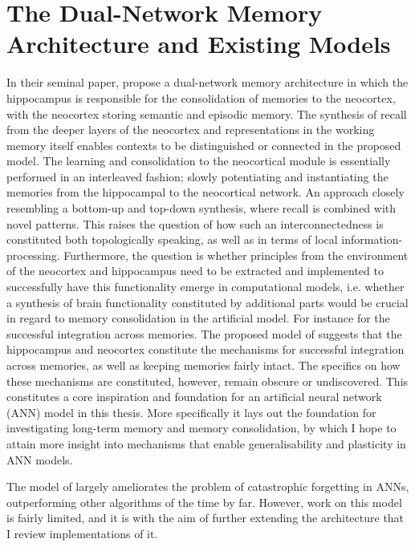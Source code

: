 \section{The Dual-Network Memory Architecture and Existing Models}\label{chpt:existing-models}

In their seminal paper, \cite{McClelland1995} propose a dual-network memory architecture in which the hippocampus is responsible for the consolidation of memories to the neocortex, with the neocortex storing semantic and episodic memory. The synthesis of recall from the deeper layers of the neocortex and representations in the working memory itself enables contexts to be distinguished or connected in the proposed model. The learning and consolidation to the neocortical module is essentially performed in an interleaved fashion; slowly potentiating and instantiating the memories from the hippocampal to the neocortical network. An approach closely resembling a bottom-up and top-down synthesis, where recall is combined with novel patterns. This raises the question of how such an interconnectedness is constituted both topologically speaking, as well as in terms of local information-processing. Furthermore, the question is whether principles from the environment of the neocortex and hippocampus need to be extracted and implemented to successfully have this functionality emerge in computational models, i.e. whether a synthesis of brain functionality constituted by additional parts would be crucial in regard to memory consolidation in the artificial model. For instance for the successful integration across memories. The proposed model of \citep{McClelland1995} suggests that the hippocampus and neocortex constitute the mechanisms for successful integration across memories, as well as keeping memories fairly intact. The specifics on how these mechanisms are constituted, however, remain obscure or undiscovered. This constitutes a core inspiration and foundation for an artificial neural network (ANN) model in this thesis. More specifically it lays out the foundation for investigating long-term memory and memory consolidation, by which I hope to attain more insight into mechanisms that enable generalisability and plasticity in ANN models.

The model of \cite{McClelland1995} largely ameliorates the problem of catastrophic forgetting in ANNs, outperforming other algorithms of the time by far. However, work on this model is fairly limited, and it is with the aim of further extending the architecture that I review implementations of it.

